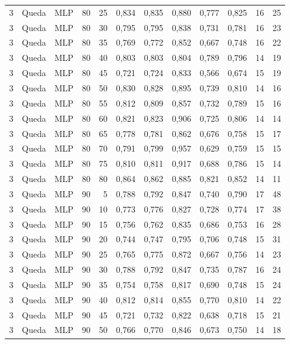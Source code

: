 \begin{longtable}{ccclrrrrrrrr}
3 & Queda & MLP & 80 & 25 & 0,834 & 0,835 & 0,880 & 0,777 & 0,825 & 16 & 25 \\
3 & Queda & MLP & 80 & 30 & 0,795 & 0,795 & 0,838 & 0,731 & 0,781 & 16 & 23 \\
3 & Queda & MLP & 80 & 35 & 0,769 & 0,772 & 0,852 & 0,667 & 0,748 & 16 & 22 \\
3 & Queda & MLP & 80 & 40 & 0,803 & 0,803 & 0,804 & 0,789 & 0,796 & 14 & 19 \\
3 & Queda & MLP & 80 & 45 & 0,721 & 0,724 & 0,833 & 0,566 & 0,674 & 15 & 19 \\
3 & Queda & MLP & 80 & 50 & 0,830 & 0,828 & 0,895 & 0,739 & 0,810 & 14 & 16 \\
3 & Queda & MLP & 80 & 55 & 0,812 & 0,809 & 0,857 & 0,732 & 0,789 & 15 & 16 \\
3 & Queda & MLP & 80 & 60 & 0,821 & 0,823 & 0,906 & 0,725 & 0,806 & 14 & 14 \\
3 & Queda & MLP & 80 & 65 & 0,778 & 0,781 & 0,862 & 0,676 & 0,758 & 15 & 17 \\
3 & Queda & MLP & 80 & 70 & 0,791 & 0,799 & 0,957 & 0,629 & 0,759 & 15 & 15 \\
3 & Queda & MLP & 80 & 75 & 0,810 & 0,811 & 0,917 & 0,688 & 0,786 & 15 & 14 \\
3 & Queda & MLP & 80 & 80 & 0,864 & 0,862 & 0,885 & 0,821 & 0,852 & 14 & 11 \\
3 & Queda & MLP & 90 & 5 & 0,788 & 0,792 & 0,847 & 0,740 & 0,790 & 17 & 48 \\
3 & Queda & MLP & 90 & 10 & 0,773 & 0,776 & 0,827 & 0,728 & 0,774 & 17 & 38 \\
3 & Queda & MLP & 90 & 15 & 0,756 & 0,762 & 0,835 & 0,686 & 0,753 & 16 & 28 \\
3 & Queda & MLP & 90 & 20 & 0,744 & 0,747 & 0,795 & 0,706 & 0,748 & 15 & 31 \\
3 & Queda & MLP & 90 & 25 & 0,765 & 0,775 & 0,872 & 0,667 & 0,756 & 14 & 23 \\
3 & Queda & MLP & 90 & 30 & 0,788 & 0,792 & 0,847 & 0,735 & 0,787 & 16 & 24 \\
3 & Queda & MLP & 90 & 35 & 0,754 & 0,758 & 0,817 & 0,690 & 0,748 & 15 & 24 \\
3 & Queda & MLP & 90 & 40 & 0,812 & 0,814 & 0,855 & 0,770 & 0,810 & 14 & 22 \\
3 & Queda & MLP & 90 & 45 & 0,721 & 0,732 & 0,822 & 0,638 & 0,718 & 15 & 21 \\
3 & Queda & MLP & 90 & 50 & 0,766 & 0,770 & 0,846 & 0,673 & 0,750 & 14 & 18 \\

\end{longtable}
